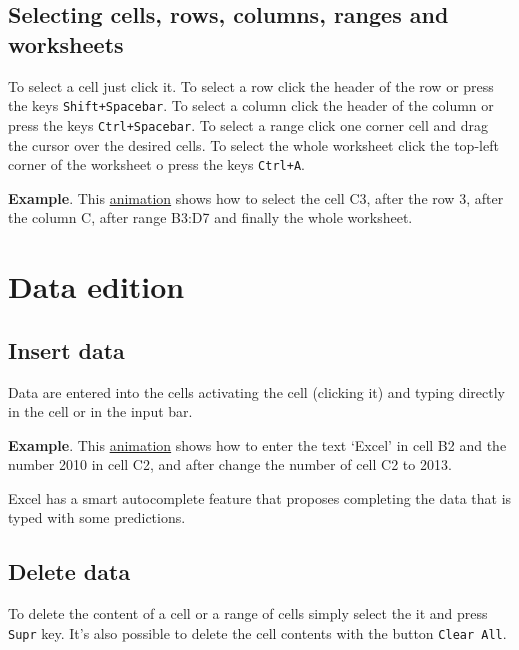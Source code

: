 \subsection{Selecting cells, rows, columns, ranges and worksheets}\hypertarget{selecting-cells-rows-columns-ranges-and-worksheets}{}\label{selecting-cells-rows-columns-ranges-and-worksheets}

To select a cell just click it. 
To select a row click the header of the row or press the keys \texttt{Shift+Spacebar}. 
To select a column click the header of the column or press the keys \texttt{Ctrl+Spacebar}.
To select a range click one corner cell and drag the cursor over the desired cells. 
To select the whole worksheet click the top-left corner of the worksheet o press the keys \texttt{Ctrl+A}.

\textbf{Example}.  This \href{http://aprendeconalf.es/office/excel/manual/img/example_cells_selection.gif}{animation} shows how to select the cell C3, after the row 3, after the column C, after range B3:D7 and finally the whole worksheet.

\section{Data edition}\hypertarget{data-edition}{}\label{data-edition}

\subsection{Insert data}\hypertarget{insert-data}{}\label{insert-data}

Data are entered into the cells activating the cell (clicking it) and typing directly in the cell or in the input bar.

\textbf{Example}.  This \href{http://aprendeconalf.es/office/excel/manual/img/example_enter_data.gif}{animation} shows how to enter the text `Excel' in cell B2 and the number 2010 in cell C2, and after change the number of cell C2 to 2013.

Excel has a smart autocomplete feature that proposes completing the data that is typed with some predictions.

\subsection{Delete data}\hypertarget{delete-data}{}\label{delete-data}

To delete the content of a cell or a range of cells simply select the it and press \texttt{Supr} key. It's also possible to delete the cell contents with the button \texttt{Clear All}.

